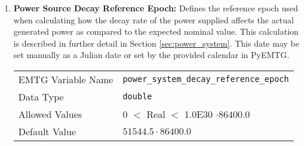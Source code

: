 \begin{enumerate}
    \item \textbf{Power Source Decay Reference Epoch:} Defines the reference epoch used when calculating how the decay rate of the power supplied affects the actual generated power as compared to the expected nominal value. This calculation is described in further detail in Section \ref{sec:power_system}. This date may be set manually as a Julian date or set by the provided calendar in PyEMTG.
    \begin{table}[H]
        \hspace{2cm}
        \begin{tabular}{lp{5cm}}
        \ac{EMTG} Variable Name & \verb|power_system_decay_reference_epoch| \\
        Data Type & \verb|double| \\
        Allowed Values & $0$ $<$ Real $<$ 1.0E30 $\cdot 86400.0$ \\
        Default Value & $51544.5 \cdot 86400.0$ \\
        \end{tabular}
    \end{table}
\end{enumerate}
